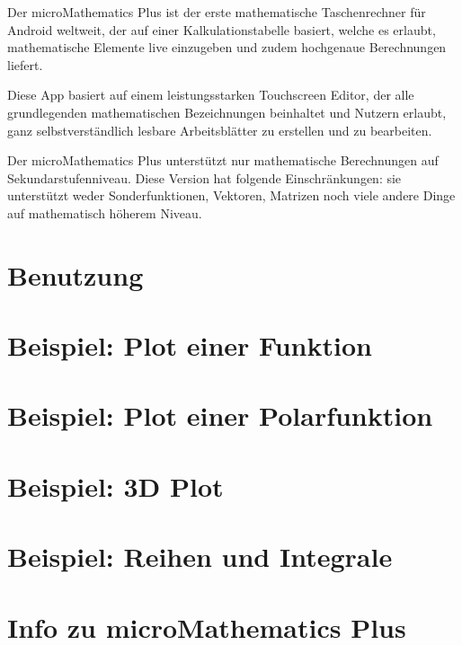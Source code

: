 \documentclass[DIV=calc, paper=a4, fontsize=11pt, twocolumn]{scrartcl}
\begin{document}
\maketitle
\thispagestyle{fancy} %

\begin{bf}
Der microMathematics Plus ist der erste
mathematische Taschenrechner für
Android weltweit, der auf einer
Kalkulationstabelle basiert, welche es
erlaubt, mathematische Elemente live
einzugeben und zudem hochgenaue
Berechnungen liefert.

Diese App basiert auf einem
leistungsstarken Touchscreen Editor,
der alle grundlegenden mathematischen
Bezeichnungen beinhaltet und Nutzern
erlaubt, ganz selbstverständlich
lesbare Arbeitsblätter zu erstellen
und zu bearbeiten.

Der microMathematics Plus unterstützt
nur mathematische Berechnungen auf
Sekundarstufenniveau. Diese Version
hat folgende Einschränkungen: sie
unterstützt weder Sonderfunktionen,
Vektoren, Matrizen noch viele andere
Dinge auf mathematisch höherem Niveau.
\end{bf}

\section{Benutzung}


\section{Beispiel: Plot einer Funktion}


\section{Beispiel: Plot einer Polarfunktion}


\section{Beispiel: 3D Plot}


\section{Beispiel: Reihen und Integrale}


\section{Info zu microMathematics Plus}
\end{document}
